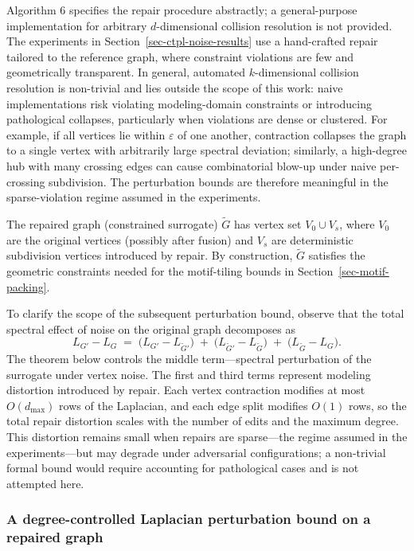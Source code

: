 \documentclass[
  11pt,
  letterpaper]{siamart251216}
\begin{document}
Algorithm 6 specifies the repair procedure abstractly; a general-purpose
implementation for arbitrary \(d\)-dimensional collision resolution is
not provided. The experiments in Section~\ref{sec-ctpl-noise-results}
use a hand-crafted repair tailored to the reference graph, where
constraint violations are few and geometrically transparent. In general,
automated \(k\)-dimensional collision resolution is non-trivial and lies
outside the scope of this work: naive implementations risk violating
modeling-domain constraints or introducing pathological collapses,
particularly when violations are dense or clustered. For example, if all
vertices lie within \(\varepsilon\) of one another, contraction
collapses the graph to a single vertex with arbitrarily large spectral
deviation; similarly, a high-degree hub with many crossing edges can
cause combinatorial blow-up under naive per-crossing subdivision. The
perturbation bounds are therefore meaningful in the sparse-violation
regime assumed in the experiments.

The repaired graph (constrained surrogate) \(\widetilde G\) has vertex
set \(V_0 \cup V_s\), where \(V_0\) are the original vertices (possibly
after fusion) and \(V_s\) are deterministic subdivision vertices
introduced by repair. By construction, \(\widetilde G\) satisfies the
geometric constraints needed for the motif-tiling bounds in
Section~\ref{sec-motif-packing}.

To clarify the scope of the subsequent perturbation bound, observe that
the total spectral effect of noise on the original graph decomposes as
\[
L_{G'} - L_G
\;=\;
\bigl(L_{G'} - L_{\widetilde G'}\bigr)
\;+\;
\bigl(L_{\widetilde G'} - L_{\widetilde G}\bigr)
\;+\;
\bigl(L_{\widetilde G} - L_G\bigr).
\] The theorem below controls the middle term---spectral perturbation of
the surrogate under vertex noise. The first and third terms represent
modeling distortion introduced by repair. Each vertex contraction
modifies at most \(O(d_{\max})\) rows of the Laplacian, and each edge
split modifies \(O(1)\) rows, so the total repair distortion scales with
the number of edits and the maximum degree. This distortion remains
small when repairs are sparse---the regime assumed in the
experiments---but may degrade under adversarial configurations; a
non-trivial formal bound would require accounting for pathological cases
and is not attempted here.

\subsubsection{A degree-controlled Laplacian perturbation bound on a
repaired
graph}\label{a-degree-controlled-laplacian-perturbation-bound-on-a-repaired-graph}
\end{document}
